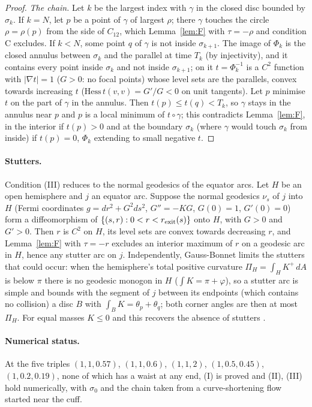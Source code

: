 \documentclass[11pt]{article}
\theoremstyle{definition}
\begin{document}
\begin{proof}
\emph{The chain.} Let $k$ be the largest index with $\gamma$ in the closed disc bounded by $\sigma_k$. If $k=N$, let $p$
be a point of $\gamma$ of largest $\rho$; there $\gamma$ touches the circle $\rho=\rho(p)$ from the side of $C_{12}$,
which Lemma~\ref{lem:F} with $\tau=-\rho$ and condition C excludes. If $k<N$, some point $q$ of $\gamma$ is not inside
$\sigma_{k+1}$. The image of $\Phi_k$ is the closed annulus between $\sigma_k$ and the parallel at time $T_k$ (by
injectivity), and it contains every point inside $\sigma_k$ and not inside $\sigma_{k+1}$; on it $t=\Phi_k^{-1}$ is a
$C^2$ function with $|\nabla t|=1$ ($G>0$: no focal points) whose level sets are the parallels, convex towards increasing
$t$ ($\mathrm{Hess}\,t(v,v)=G'/G<0$ on unit tangents). Let $p$ minimise $t$ on the part of $\gamma$ in the annulus.
Then $t(p)\le t(q)<T_k$, so $\gamma$ stays in the annulus near $p$ and $p$ is a local minimum of $t\circ\gamma$; this
contradicts Lemma~\ref{lem:F}, in the interior if $t(p)>0$ and at the boundary $\sigma_k$ (where $\gamma$ would touch
$\sigma_k$ from inside) if $t(p)=0$, $\Phi_k$ extending to small negative $t$.
\end{proof}

\paragraph{Stutters.} Condition (III) reduces to the normal geodesics of the equator arcs. Let $H$ be an open hemisphere
and $j$ an equator arc. Suppose the normal geodesics $\nu_s$ of $j$ into $H$ (Fermi coordinates $g=dr^2+G^2ds^2$,
$G''=-KG$, $G(0)=1$, $G'(0)=0$) form a diffeomorphism of $\{(s,r):0<r<r_{\rm exit}(s)\}$ onto $H$, with $G>0$ and
$G'>0$. Then $r$ is $C^2$ on $H$, its level sets are convex towards decreasing $r$, and Lemma~\ref{lem:F} with $\tau=-r$
excludes an interior maximum of $r$ on a geodesic arc in $H$, hence any stutter arc on $j$. Independently, Gauss-Bonnet
limits the stutters that could occur: when the hemisphere's total positive curvature
$\Pi_H=\int_HK^+\,dA$ is below $\pi$ there is no geodesic monogon in $H$ ($\int K=\pi+\varphi$), so a stutter arc is
simple and bounds with the segment of $j$ between its endpoints (which contains no collision) a disc $B$ with
$\int_BK=\theta_p+\theta_q$; both corner angles are then at most $\Pi_H$. For equal masses $K\le0$ and this recovers the
absence of stutters \cite[Prop.~2.2]{KLM08}.

\paragraph{Numerical status.} At the five triples $(1,1,0.57)$, $(1,1,0.6)$, $(1,1,2)$, $(1,0.5,0.45)$,
$(1,0.2,0.19)$, none of which has a waist at any end, (I) is proved and (II), (III) hold numerically, with $\sigma_0$
and the chain taken from a curve-shortening flow started near the cuff.
\end{document}

